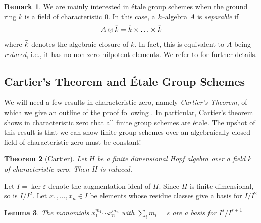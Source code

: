\documentclass{article}
\theoremstyle{plain}
\newtheorem{Th}{Theorem}[section]
\newtheorem{Lemma}[Th]{Lemma}
\theoremstyle{definition}
\newtheorem{Rem}[Th]{Remark}
\begin{document}
 \begin{Rem}
    We are mainly interested in \'etale group schemes when the ground ring $k$ is a field of characteristic 0. In this case, a $k$--algebra $A$ is \textit{separable} if 
    \[
    A \otimes \Bar{k} = \Bar{k} \times \ldots \times \Bar{k}
    \]
    where $\Bar{k}$ denotes the algebraic closure of $k$. In fact, this is equivalent to $A$ being \textit{reduced}, i.e., it has no non-zero nilpotent elements. We refer to \cite[Section 6.2]{Wat79} for further details.
 \end{Rem}


\subsection*{Cartier's Theorem and \'Etale Group Schemes}

We will need a few results in characteristic zero, namely \textit{Cartier's Theorem}, of which we give an outline of the proof following \cite{Wat79}. In particular, Cartier's theorem shows in characteristic zero that all finite group schemes are \'etale. The upshot of this result is that we can show finite group schemes over an algebraically closed field of characteristic zero must be constant!

\begin{Th}[Cartier]\label{Thm:Cartier}
    Let $H$ be a finite dimensional Hopf algebra over a field $k$ of characteristic zero. Then $H$ is reduced.
\end{Th}
Let $I=\ker \varepsilon$ denote the augmentation ideal of $H$. Since $H$ is finite dimensional, so is $I/I^2$. Let $x_1,\dots, x_n \in I$ be elements whose residue classes give a basis for $I/I^2$

\begin{Lemma}\label{lemma-monomials}
    The monomials $x_1^{m_1}\cdots x_n^{m_n}$ with $\sum_i m_i=s$ are a basis for $I^s/I^{s+1}$
\end{Lemma}
\end{document}
